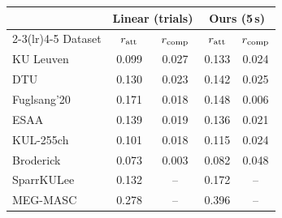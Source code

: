 \begin{tabular}{lcccc}\toprule
 & \multicolumn{2}{c}{Linear (trials)} & \multicolumn{2}{c}{Ours (5\,s)} \\
\cmidrule(lr){2-3}\cmidrule(lr){4-5}
Dataset & $r_{\rm att}$ & $r_{\rm comp}$ & $r_{\rm att}$ & $r_{\rm comp}$ \\\midrule
KU Leuven & 0.099 & 0.027 & 0.133 & 0.024 \\
DTU & 0.130 & 0.023 & 0.142 & 0.025 \\
Fuglsang'20 & 0.171 & 0.018 & 0.148 & 0.006 \\
ESAA & 0.139 & 0.019 & 0.136 & 0.021 \\
KUL-255ch & 0.101 & 0.018 & 0.115 & 0.024 \\
Broderick & 0.073 & 0.003 & 0.082 & 0.048 \\
\midrule
SparrKULee & 0.132 & -- & 0.172 & -- \\
MEG-MASC & 0.278 & -- & 0.396 & -- \\
\bottomrule\end{tabular}
